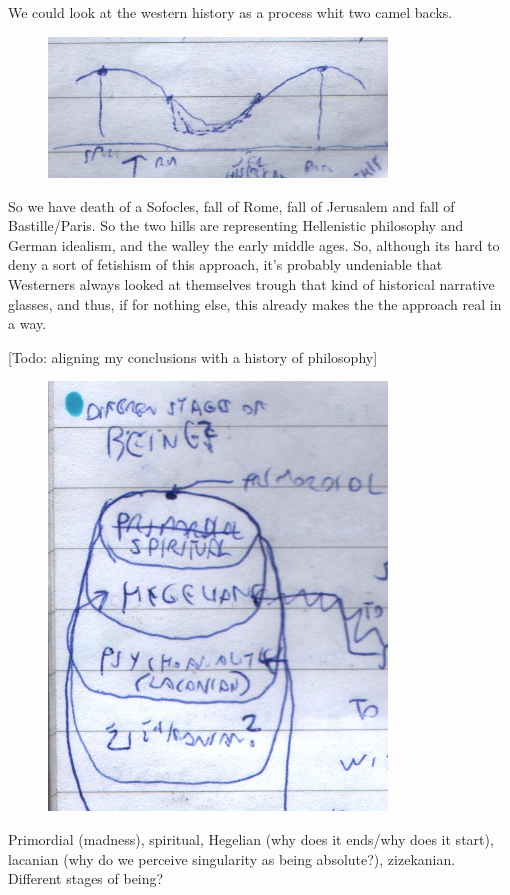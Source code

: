 \documentclass{book}
\begin{document}
We could look at the western history as a process whit two camel backs. 
\begin{figure}[ht!]
\centering
\includegraphics[width=90mm]{scan11.jpg}
\label{overflow}
\end{figure}
So we have death of a Sofocles, fall of Rome, fall of Jerusalem and fall of Bastille/Paris. So the two hills are representing Hellenistic philosophy and German idealism, and the walley the early middle ages.
So, although its hard to deny a sort of fetishism of this approach, it's probably undeniable that Westerners always looked at themselves trough that kind of historical narrative glasses, and  thus, if for nothing else, this already makes the the approach real in a way.

[Todo: aligning my conclusions with a history of philosophy]

\begin{figure}[ht!]
\centering
\includegraphics[width=90mm]{scan13.jpg}
\label{overflow}
\end{figure}
Primordial (madness), spiritual, Hegelian (why does it ends/why does it start), lacanian (why do we perceive singularity as being absolute?), zizekanian. 
Different stages of being?
\end{document}
